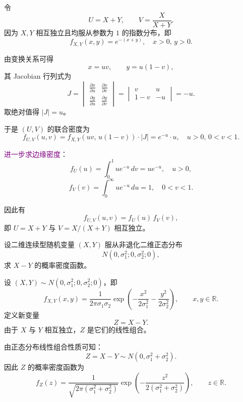 \begin{solution}
令
\[
U = X + Y, \qquad V = \frac{X}{X + Y}.
\]
因为 $X,Y$ 相互独立且均服从参数为 $1$ 的指数分布，即
\[
f_{X,Y}(x,y) = e^{-(x+y)}, \quad x>0,\,y>0.
\]

由变换关系可得
\[
x = uv, \qquad y = u(1-v),
\]
其 Jacobian 行列式为
\[
J = 
\begin{vmatrix}
\frac{\partial x}{\partial u} & \frac{\partial x}{\partial v}\\[4pt]
\frac{\partial y}{\partial u} & \frac{\partial y}{\partial v}
\end{vmatrix}
=
\begin{vmatrix}
v & u\\[4pt]
1-v & -u
\end{vmatrix}
= -u.
\]
取绝对值得 $\lvert J\rvert = u$。

于是 $(U,V)$ 的联合密度为
\[
f_{U,V}(u,v)
= f_{X,Y}(uv,\,u(1-v)) \cdot |J|
= e^{-u} \cdot u, \quad u>0,\,0<v<1.
\]

\textcolor{purple}{进一步求边缘密度}：
\[
f_U(u) = \int_0^1 u e^{-u} \,dv = u e^{-u}, \quad u>0,
\]
\[
f_V(v) = \int_0^\infty u e^{-u} \,du = 1, \quad 0<v<1.
\]

因此有
\[
f_{U,V}(u,v) = f_U(u)\,f_V(v),
\]
即 $U=X+Y$ 与 $V=X/(X+Y)$ 相互独立。
\end{solution}
\begin{homework}[62]
设二维连续型随机变量 $(X,Y)$ 服从非退化二维正态分布 
\[
N(0,\sigma_1^2;0,\sigma_2^2;0),
\]
求 $X-Y$ 的概率密度函数。
\end{homework}
\begin{solution}
设 $(X,Y)\sim N(0,\sigma_1^2;0,\sigma_2^2;0)$，即
\[
f_{X,Y}(x,y)
=\frac{1}{2\pi\sigma_1\sigma_2}
\exp\!\left(-\frac{x^2}{2\sigma_1^2}-\frac{y^2}{2\sigma_2^2}\right),
\qquad x,y\in\mathbb{R}.
\]
定义新变量
\[
Z = X - Y.
\]
由于 $X$ 与 $Y$ 相互独立，$Z$ 是它们的线性组合。

由正态分布线性组合性质可知：
\[
Z = X - Y \sim N(0,\sigma_1^2+\sigma_2^2).
\]
因此 $Z$ 的概率密度函数为
\[
f_Z(z)
= \frac{1}{\sqrt{2\pi(\sigma_1^2+\sigma_2^2)}}
  \exp\!\left(-\frac{z^2}{2(\sigma_1^2+\sigma_2^2)}\right),
\qquad z\in\mathbb{R}.
\]
\end{solution}

